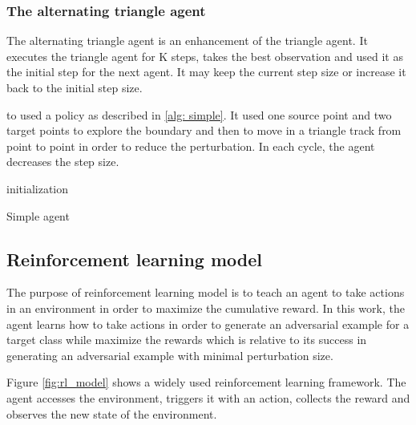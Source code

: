 \documentclass{article}
\begin{document}
\subsubsection{The alternating triangle agent}
The alternating triangle agent is an enhancement of the triangle agent. It executes the triangle agent for K steps, takes the best observation and used it as the initial step for the next agent. It may keep the current step size or increase it back to the initial step size.

to  used a policy as described in \ref{alg: simple}. It used one source point and two target points to explore the boundary and then to move in a triangle track from point to point in order to reduce the perturbation. In each cycle, the agent decreases the step size.

\begin{algorithm}[H] \label{alg:simple}
\SetAlgoLined
{}
 initialization\;
 \caption{Simple agent}
\end{algorithm}





\subsection{Reinforcement learning model}
The purpose of reinforcement learning model is to teach an agent to take actions in an environment in order to maximize the cumulative reward. In this work, the agent learns how to take actions in order to generate an adversarial example for a target class while maximize the rewards which is relative to its success in generating an adversarial example with minimal perturbation size.

Figure \ref{fig:rl_model} shows a widely used reinforcement learning framework. The agent accesses the environment, triggers it with an action, collects the reward and observes the new state of the environment.
\end{document}
